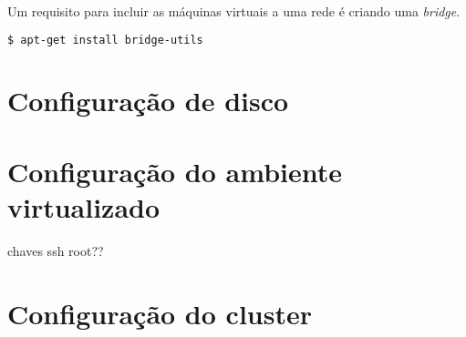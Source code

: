 Um requisito para incluir as máquinas virtuais a uma rede é criando uma \textit{bridge}. 

\begin{lstlisting}[language=bash]
  $ apt-get install bridge-utils
\end{lstlisting}

\section{Configuração de disco}


\section{Configuração do ambiente virtualizado}

chaves ssh root??

\section{Configuração do cluster}

